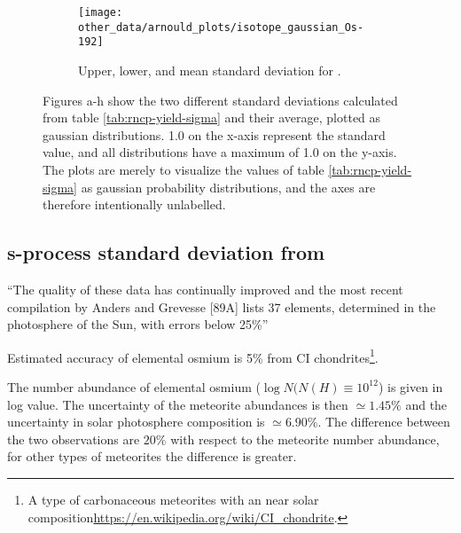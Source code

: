 \begin{figure}
\begin{subfigure}{\subfiglength}
  \end{subfigure}
  \begin{subfigure}{\subfiglength}
    \centering
    \texttt{[image: other\_data/arnould\_plots/isotope\_gaussian\_Os-192]}
    \caption{Upper, lower, and mean standard deviation for .}
  \end{subfigure}
  \caption{\label{fig:arnould-gauss-dist}
    Figures a-h show the two different standard deviations calculated from table \ref{tab:rncp-yield-sigma} and their average, plotted as gaussian distributions.
    1.0 on the x-axis represent the standard value, and all distributions have a maximum of 1.0 on the y-axis.
    The plots are merely to visualize the values of table \ref{tab:rncp-yield-sigma} as gaussian probability distributions, and the axes are therefore intentionally unlabelled.
  }
\end{figure}
\FloatBarrier

\subsection{s-process standard deviation from \cite{landolt93}}
``The quality of these data has continually improved and the most recent compilation by
Anders and Grevesse [89A] lists 37 elements, determined in the photosphere of the Sun, with errors below
25\%''\cite[p.197]{landolt93}

Estimated accuracy of elemental osmium is 5\% from CI chondrites\footnote{A type of carbonaceous meteorites with an near solar composition\url{https://en.wikipedia.org/wiki/CI_chondrite}.}\cite[table2, p.203]{landolt93}.

The number abundance of elemental osmium ($\log N(N(H)\equiv 10^{12}$) is given in log value. The uncertainty of the meteorite abundances is then $\simeq 1.45\%$ and the uncertainty in solar photosphere composition is $\simeq 6.90\%$. The difference between the two observations are $20\%$ with respect to the meteorite number abundance\cite[table3, p.205]{landolt93}, for other types of meteorites the difference is greater.

